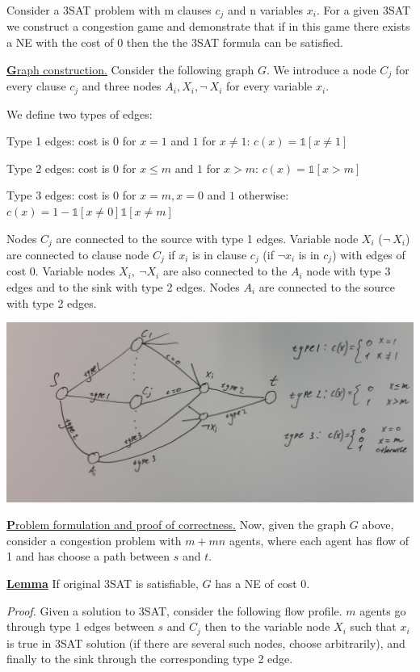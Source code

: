 Consider a 3SAT problem with m clauses $c_j$ and n variables $x_i$. For a given 3SAT we construct a congestion game and demonstrate that if in this game there exists a NE with the cost of 0 then the the 3SAT formula can be satisfied.
\bigskip

\uline{\textbf Graph construction.} Consider the following graph $G$. We introduce a node $C_j$ for every clause $c_j$ and three nodes $A_i,X_i,\neg\ X_i$ for every variable $x_i$.

We define two types of edges:

Type 1 edges: cost is 0 for $x=1$ and $1$ for $x\neq 1$: $c(x) = \mathbb 1[x\neq 1]$

Type 2 edges: cost is 0 for $x\leq m$ and $1$ for $x>m$: $c(x) = \mathbb 1 [x>m]$

Type 3 edges: cost is 0 for $x=m,x=0$ and $1$ otherwise: $c(x) = 1- \mathbb 1 [x\neq0]\mathbb 1 [x\neq m]$

Nodes $C_j$ are connected to the source with type 1 edges. Variable node $X_i$ ($\neg\ X_i$) are connected to clause node $C_j$ if $x_i$ is in clause $c_j$ (if $\neg x_i$ is in $c_j$) with edges of cost 0.  Variable nodes $X_i,\ \neg X_i$ are also connected to the $A_i$ node with type 3 edges and to the sink with type 2 edges. Nodes $A_i$ are connected to the source with type 2 edges.

\includegraphics[scale=0.1]{1.jpg}

\uline{\textbf Problem formulation and proof of correctness.} Now, given the graph $G$ above, consider a congestion problem with $m + mn$ agents, where each agent has flow of 1 and has choose a path between $s$ and $t$. 
\bigskip

\uline{\textbf{Lemma}} If original 3SAT is satisfiable, $G$ has a NE of cost 0.

\textit{Proof.} Given a solution to 3SAT, consider the following flow profile. $m$ agents go through type 1 edges between $s$ and $C_j$ then to the variable node $X_i$ such that $x_i$ is true in 3SAT solution (if there are several such nodes, choose arbitrarily), and finally to the sink through the corresponding type 2 edge. 

